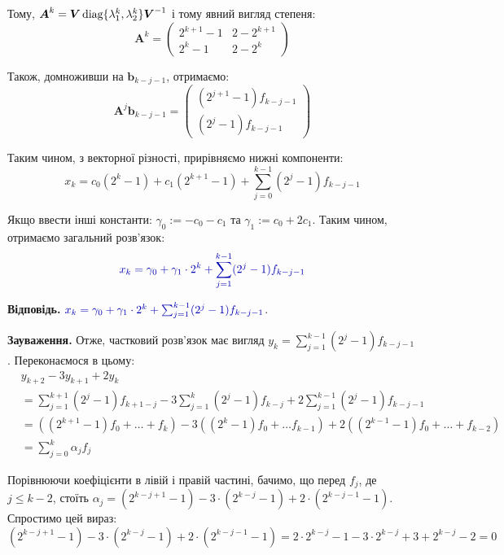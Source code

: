 \documentclass{hw_template}
\begin{document}
Тому, $\boldsymbol{A}^k = \boldsymbol{V}\operatorname{\text{diag}}\{\lambda_1^k,\lambda_2^k\}\boldsymbol{V}^{-1}$ і тому явний вигляд степеня:
\begin{equation*}
    \boldsymbol{A}^k = \begin{pmatrix}
        2^{k+1} - 1 & 2 - 2^{k+1} \\
        2^k - 1 & 2-2^k
    \end{pmatrix}
\end{equation*}

Також, домноживши на $\boldsymbol{b}_{k-j-1}$, отримаємо:
\begin{equation*}
    \boldsymbol{A}^j\boldsymbol{b}_{k-j-1} = \begin{pmatrix}
        (2^{j+1}-1)f_{k-j-1} \\
        (2^j-1)f_{k-j-1}
    \end{pmatrix}
\end{equation*}

Таким чином, з векторної різності, прирівняємо нижні компоненти:
\begin{equation*}
    x_k = c_0(2^k-1) + c_1(2^{k+1}-1) + \sum_{j=0}^{k-1}(2^j-1)f_{k-j-1}
\end{equation*}

Якщо ввести інші константи: $\gamma_0 := -c_0-c_1$ та $\gamma_1 := c_0+2c_1$. Таким чином,
отримаємо загальний розв'язок:
\begin{equation*}
    \textcolor{blue!70!black}{x_k = \gamma_0 + \gamma_1\cdot 2^k + \sum_{j=1}^{k-1}(2^j-1)f_{k-j-1}}
\end{equation*}

\textbf{Відповідь.} $\textcolor{blue!70!black}{x_k = \gamma_0 + \gamma_1\cdot 2^k + \sum_{j=1}^{k-1}(2^j-1)f_{k-j-1}}$.

\vspace{20pt}

\textbf{Зауваження.} Отже, частковий розв'язок має вигляд
$y_k = \sum_{j=1}^{k-1}(2^j-1)f_{k-j-1}$. Переконаємося в цьому:
\begin{align*}
    &y_{k+2} - 3y_{k+1} + 2y_k \\
    &=\sum_{j=1}^{k+1}(2^j-1)f_{k+1-j} - 3\sum_{j=1}^{k}(2^j-1)f_{k-j} + 2\sum_{j=1}^{k-1}(2^j-1)f_{k-j-1} \\
    &= ((2^{k+1}-1)f_0 + \dots + f_k) - 3((2^k-1)f_0 + \dots f_{k-1}) + 2((2^{k-1}-1)f_0 + \dots + f_{k-2}) \\
    &= \sum_{j=0}^k \alpha_j f_j
\end{align*}

Порівнюючи коефіцієнти в лівій і правій частині, бачимо, що перед $f_j$, де $j \leq k-2$, стоїть 
$\alpha_j = (2^{k-j+1}-1) - 3 \cdot (2^{k-j}-1) + 2 \cdot (2^{k-j-1}-1)$. Спростимо цей вираз:
\begin{equation*}
    (2^{k-j+1}-1) - 3 \cdot (2^{k-j}-1) + 2 \cdot (2^{k-j-1}-1) = 2 \cdot 2^{k-j} - 1 - 3 \cdot 2^{k-j} + 3 + 2^{k-j} - 2 = 0
\end{equation*}
\end{document}
